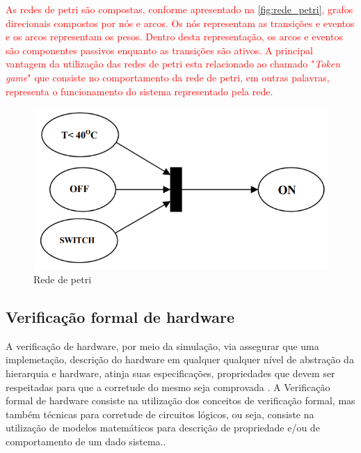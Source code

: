 \par
\textcolor{red}{ As redes de petri são compostas, conforme apresentado na \autoref{fig:rede_petri}, grafos direcionais compostos por nós e arcos. Os nós representam as transições e eventos e os arcos representam os pesos. Dentro desta representação, os arcos e eventos são componentes passivos enquanto as transições são ativos. A principal vantagem da utilização das redes de petri esta relacionado ao chamado "\textit{Token game}" que consiste no comportamento da rede de petri, em outras palavras, representa o funcionamento do sistema representado pela rede\cite{halder2006}.}

\begin{figure}[htb]
	\begin{center}
    \caption{\label{fig:rede_petri}Rede de petri}
	\includegraphics[scale=0.40]{Figuras/rede_petri.png}
	\end{center}
\end{figure}
\subsection{Verificação formal de hardware}

A verificação de hardware, por meio da simulação, via assegurar que uma implemetação, descrição do hardware em qualquer qualquer nível de abstração da hierarquia e hardware, atinja suas especificações, propriedades que devem ser respeitadas para que a corretude do mesmo seja comprovada \cite{gupta1992formal}. A Verificação formal de hardware consiste na utilização dos conceitos de verificação formal, mas também técnicas para corretude de circuitos lógicos, ou seja, consiste na utilização de modelos matemáticos para descrição de propriedade e/ou de comportamento de um dado sistema.\cite{kropf2013introduction}.

